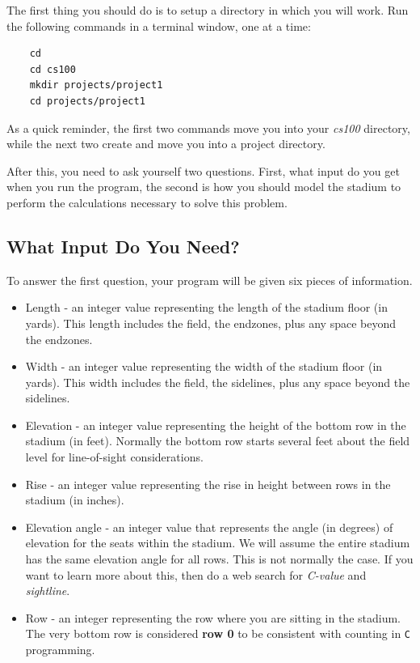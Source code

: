 \documentclass[12pt]{article}
\begin{document}
The first thing you should do is to setup a directory in which you will work.
Run the following commands in a terminal window, one at a time:

\begin{verbatim}
    cd
    cd cs100
    mkdir projects/project1
    cd projects/project1
\end{verbatim}

As a quick reminder, the first two commands move you into your {\it cs100}
directory, while the next two create and move you into a project directory.

After this, you need to ask yourself two questions.  First, what input do you
get when you run the program, the second is how you should model the stadium
to perform the calculations necessary to solve this problem.

\subsection*{What Input Do You Need?}

To answer the first question, your program will be given six pieces of information.

\begin{itemize}
\item Length - an integer value representing the length of the stadium floor (in yards).
This length includes the field, the endzones, plus any space beyond the endzones.
\item Width - an integer value representing the width of the stadium floor (in yards).
This width includes the field, the sidelines, plus any space beyond the sidelines.
\item Elevation - an integer value representing the height of the bottom row 
in the stadium (in feet).  Normally the bottom row starts several feet about the field
level for line-of-sight considerations.
\item Rise - an integer value representing the rise in height between rows in the
stadium (in inches).
\item Elevation angle -
an integer value that represents the angle (in degrees) of elevation for
the seats within the stadium.  We will assume the entire stadium has the same elevation
angle for all rows.  This is not normally the case.  If you want to learn more about
this, then do a web search for {\it C-value} and {\it sightline}.
\item Row - an integer representing the row where you are sitting in the stadium.
The very bottom row is considered {\bf row 0} to be consistent with counting in
{\tt C} programming.
\end{itemize}
\end{document}
